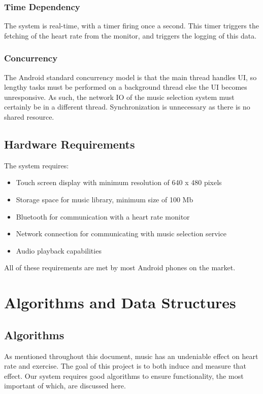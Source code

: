 \documentclass[letterpaper,english, 12pt]{scrreprt}
\begin{document}
\subsection{Time Dependency}
The system is real-time, with a timer firing once a second.
This timer triggers the fetching of the heart rate from the monitor, and triggers the logging of this data.

\subsection{Concurrency}
The Android standard concurrency model is that the main thread handles UI, so lengthy tasks must be performed on a background thread else the UI becomes unresponsive.
As such, the network IO of the music selection system must certainly be in a different thread.
Synchronization is unnecessary as there is no shared resource.

\section{Hardware Requirements}
The system requires:
\begin{itemize}
  \item Touch screen display with minimum resolution of 640 x 480 pixels
  \item Storage space for music library, minimum size of 100 Mb
  \item Bluetooth for communication with a heart rate monitor
  \item Network connection for communicating with music selection service
  \item Audio playback capabilities
\end{itemize}
All of these requirements are met by most Android phones on the market.

\chapter{Algorithms and Data Structures}
\section{Algorithms}

As mentioned throughout this document, music has an undeniable effect on heart rate and exercise. The goal of this project is to both induce and measure that effect. Our system requires good algorithms to ensure functionality, the most important of which, are discussed here. \newline
\end{document}
